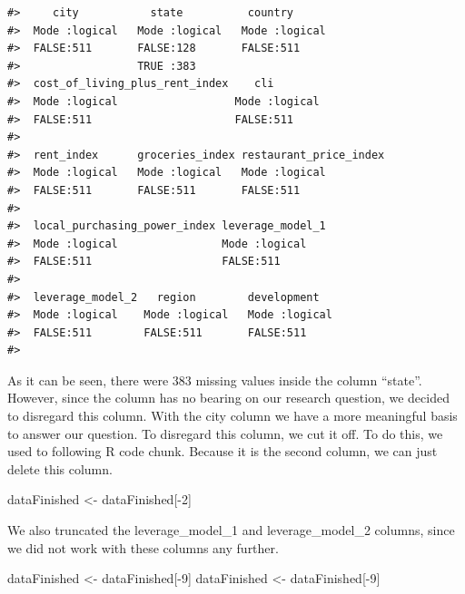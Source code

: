 \documentclass[
  11pt,
  a4paper,
  twoside]{scrbook}
\newenvironment{Shaded}{\begin{snugshade}}{\end{snugshade}}
\newcommand{\DecValTok}[1]{\textcolor[rgb]{0.00,0.00,0.81}{#1}}
\newcommand{\NormalTok}[1]{#1}
\newcommand{\OtherTok}[1]{\textcolor[rgb]{0.56,0.35,0.01}{#1}}
\newcommand{\SpecialCharTok}[1]{\textcolor[rgb]{0.00,0.00,0.00}{#1}}
\begin{document}
\begin{verbatim}
#>     city           state          country       
#>  Mode :logical   Mode :logical   Mode :logical  
#>  FALSE:511       FALSE:128       FALSE:511      
#>                  TRUE :383                      
#>  cost_of_living_plus_rent_index    cli         
#>  Mode :logical                  Mode :logical  
#>  FALSE:511                      FALSE:511      
#>                                                
#>  rent_index      groceries_index restaurant_price_index
#>  Mode :logical   Mode :logical   Mode :logical         
#>  FALSE:511       FALSE:511       FALSE:511             
#>                                                        
#>  local_purchasing_power_index leverage_model_1
#>  Mode :logical                Mode :logical   
#>  FALSE:511                    FALSE:511       
#>                                               
#>  leverage_model_2   region        development    
#>  Mode :logical    Mode :logical   Mode :logical  
#>  FALSE:511        FALSE:511       FALSE:511      
#> 
\end{verbatim}

As it can be seen, there were \(383\) missing values inside the column ``state''.
However, since the column has no bearing on our research question, we decided to disregard this column. With the city column we have a more meaningful basis to answer our question.
To disregard this column, we cut it off. To do this, we used to following R code chunk. Because it is the second column, we can just delete this column.

\linespread{1}

\begin{Shaded}
\begin{Highlighting}[]
\NormalTok{dataFinished }\OtherTok{\textless{}{-}}\NormalTok{ dataFinished[}\SpecialCharTok{{-}}\DecValTok{2}\NormalTok{]}
\end{Highlighting}
\end{Shaded}

\linespread{1}

We also truncated the leverage\_model\_1 and leverage\_model\_2 columns, since we did not work with these columns any further.

\linespread{1}

\begin{Shaded}
\begin{Highlighting}[]
\NormalTok{dataFinished }\OtherTok{\textless{}{-}}\NormalTok{ dataFinished[}\SpecialCharTok{{-}}\DecValTok{9}\NormalTok{]}
\NormalTok{dataFinished }\OtherTok{\textless{}{-}}\NormalTok{ dataFinished[}\SpecialCharTok{{-}}\DecValTok{9}\NormalTok{]}
\end{Highlighting}
\end{Shaded}
\end{document}
